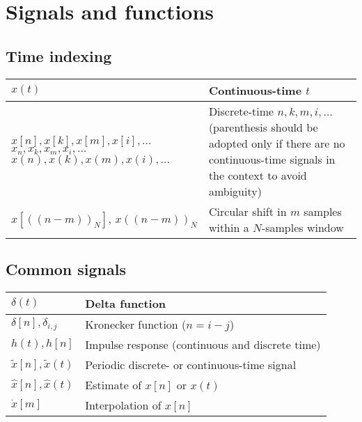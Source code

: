 \section{Signals and functions}
\subsection{Time indexing}
\begin{xltabular}{\textwidth}{p{5.7cm}X}
	\(x(t)\)                                                                                                                                                                                      & Continuous-time \(t\)                                                                                                                              \\ \hline
	\(x[n], x[k], x[m], x[i], \dots\) \(x_n, x_k, x_m, x_i, \dots\) \(x(n), x(k), x(m), x(i), \dots\)                                                                                             & Discrete-time \(n, k, m, i, \dots\) (parenthesis should be adopted only if there are no continuous-time signals in the context to avoid ambiguity) \\ \hline
	\(x\left[ \left( \left( n - m \right) \right)_N \right]\)\cite{oppenheimDiscreteTimeSignalProcessing2009}, \(x \left( \left( n - m \right) \right)_N\)\cite{ingleDigitalSignalProcessing2000} & Circular shift in \(m\) samples within a \(N\)-samples window
\end{xltabular}
\subsection{Common signals}
\begin{xltabular}{\textwidth}{XX}
	\(\delta(t)\)                  & Delta function                                  \\ \hline
	\(\delta[n], \delta_{i,j}\)    & Kronecker function (\(n = i-j\))                \\ \hline
	\(h(t), h[n]\)                 & Impulse response (continuous and discrete time) \\ \hline
	\(\tilde{x}[n], \tilde{x}(t)\) & Periodic discrete- or continuous-time signal    \\ \hline
	\(\hat{x}[n], \hat{x}(t)\)     & Estimate of \(x[n]\) or \(x(t)\)                \\ \hline
	\(\dot{x}[m]\)                 & Interpolation of \(x[n]\)                       \\
\end{xltabular}
